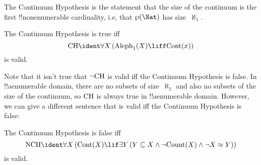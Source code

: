 \documentclass[../../../include/open-logic-section]{subfiles}
\begin{document}
\begin{explain}
The Continuum Hypothesis is the statement that the size of the
continuum is the first !!{nonenumerable} cardinality, i.e, that
$\Pow{\Nat}$ has size~$\aleph_1$. 
\end{explain}

\begin{prop}
The Continuum Hypothesis is true iff \[\fn{CH} \ident
\lforall[X][(\fn{Aleph}_1(X) \liff \fn{Cont}(x))]\] is valid.
\end{prop}

Note that it isn't true that $\lnot \mathrm{CH}$ is valid iff the
Continuum Hypothesis is false. In !!a{enumerable} domain, there are no
subsets of size~$\aleph_1$ and also no subsets of the size of the
continuum, so $\mathrm{CH}$ is always true in !!a{enumerable}
domain. However, we can give a different sentence that is valid iff
the Continuum Hypothesis is false:

\begin{prop}
The Continuum Hypothesis is false iff \[\fn{NCH} \ident
\lforall[X][(\fn{Cont}(X) \lif \lexists[Y][(Y \subseteq X \land \lnot
    \fn{Count}(X) \land \lnot \cardeq{X}{Y})])]\] is valid.
\end{prop}
\end{document}
